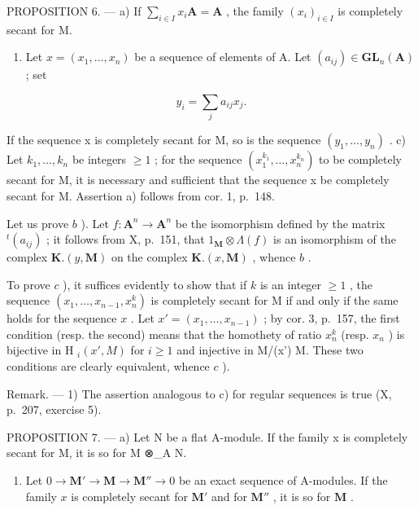 PROPOSITION 6. --- a) If \(\sum_{i\in I}x_i\mathbf{A} = \mathbf{A}\) , the family \((x_i)_{i\in I}\) is completely secant for M.

\begin{enumerate}
\def\labelenumi{\alph{enumi})}
\setcounter{enumi}{1}
\tightlist
\item
  Let \(x = (x_1, \ldots, x_n)\) be a sequence of elements of A. Let \((a_{ij}) \in \mathbf{GL}_n(\mathbf{A})\) ; set
\end{enumerate}

\[
y _ {i} = \sum_ {j} a _ {i j} x _ {j}.
\]

If the sequence x is completely secant for M, so is the sequence \((y_{1}, \ldots, y_{n})\) . c) Let \(k_{1}, \ldots, k_{n}\) be integers \(\geqslant 1\) ; for the sequence \((x_{1}^{k_{1}}, \ldots, x_{n}^{k_{n}})\) to be completely secant for M, it is necessary and sufficient that the sequence x be completely secant for M. Assertion a) follows from cor. 1, p.~148.

Let us prove \(b\) ). Let \(f: \mathbf{A}^n \to \mathbf{A}^n\) be the isomorphism defined by the matrix \(^t(a_{ij})\) ; it follows from X, p.~151, that \(1_{\mathbf{M}} \otimes \Lambda(f)\) is an isomorphism of the complex \(\mathbf{K}.(y, \mathbf{M})\) on the complex \(\mathbf{K}.(x, \mathbf{M})\) , whence \(b\) .

To prove \(c\) ), it suffices evidently to show that if \(k\) is an integer \(\geqslant 1\) , the sequence \((x_{1}, \ldots, x_{n-1}, x_{n}^{k})\) is completely secant for M if and only if the same holds for the sequence \(x\) . Let \(x' = (x_{1}, \ldots, x_{n-1})\) ; by cor. 3, p.~157, the first condition (resp. the second) means that the homothety of ratio \(x_{n}^{k}\) (resp. \(x_{n}\) ) is bijective in H \(_{i}(x', M)\) for \(i \geqslant 1\) and injective in M/(x') M. These two conditions are clearly equivalent, whence \(c\) ).

Remark. --- 1) The assertion analogous to c) for regular sequences is true (X, p.~207, exercise 5).

PROPOSITION 7. --- a) Let N be a flat A-module. If the family x is completely secant for M, it is so for M ⊗\_A N.

\begin{enumerate}
\def\labelenumi{\alph{enumi})}
\setcounter{enumi}{1}
\tightlist
\item
  Let \(0 \to \mathbf{M}' \to \mathbf{M} \to \mathbf{M}'' \to 0\) be an exact sequence of A-modules. If the family \(x\) is completely secant for \(\mathbf{M}'\) and for \(\mathbf{M}''\) , it is so for \(\mathbf{M}\) .
\end{enumerate}

